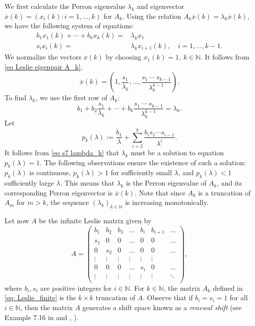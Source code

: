 \documentclass[11pt,reqno]{amsart}
\theoremstyle{definition}
\theoremstyle{remark}
\theoremstyle{plain}
\def\ol{\overline}
\newcommand{\N}{\mathbb N}
\newcommand{\be}{\begin{equation}}
\newcommand{\ee}{\end{equation}}
\newcommand{\ba}{\begin{aligned}}
\newcommand{\ea}{\end{aligned}}
\numberwithin{equation}{section}
\begin{document}
We first calculate the Perron eigenvalue $\lambda_k$ and eigenvector 
$\ol x(k) =(x_i(k) :i =1,..., k)$ for $A_k$. Using the relation
$A_k \ol x(k) = \lambda_k \ol x(k)$, we have the following system of equations:
\be\label{eq Leslie eigenpair A_k}
\ba 
b_1 x_1(k) + \cdots + b_k x_k(k) = & \lambda_k x_1\\
s_i x_i(k) = & \lambda_k x_{i+1}(k), \quad i = 1, ..., k-1.
\ea
\ee
We normalize the vectors $\ol x(k)$ by choosing $x_1(k) =1,\ k \in \N$. It follows from \eqref{eq Leslie eigenpair A_k},
\be\label{eq x(k) for Leslie A_k}
\ol x(k)  = \left(1, \frac{s_1}{\lambda_k}, \ldots, \frac{s_1\ \cdots \ s_{k-1}}{\lambda_k^{k-1}}\right).
\ee
To find $\lambda_k$, we use the first row of $A_k$:
\be\label{eq s7 lambda_k}
b_1 + b_2 \frac{s_1}{\lambda_k} + \cdots + b_k\frac{s_1\ \cdots\  s_{k-1}}{\lambda_k^{k-1}} = \lambda_k. 
\ee
Let 
$$
p_k(\lambda) := \dfrac{b_1}{\lambda} + \sum_{i=2}^k \frac{b_i s_1\cdots s_{i-1} }{\lambda^{i}}.
$$ 
It follows from \eqref{eq s7 lambda_k} that $\lambda_k$ must be a solution to equation $p_k(\lambda) =1$. The following observations ensure the existence of such a solution: 
$p_k(\lambda)$ is continuous, $p_k(\lambda)> 1$ for sufficiently small $\lambda$, and $p_k(\lambda) < 1$ sufficiently large $\lambda$. This means that $\lambda_k$ is the Perron eigenvalue of $A_k$, and its corresponding Perron eigenvector is $\ol x(k)$. Note that since $A_k$ is a truncation of $A_m$ for $m>k$, the sequence $(\lambda_k)_{k \in \N}$ is increasing monotonically. 

Let now $A$ be the infinite Leslie matrix given by
\begin{equation}\label{Mat: Les_inf}
    A = \begin{pmatrix}
b_1 & b_2 & b_3 &  \ldots & b_i & b_{i+1} &\ldots\\
s_1 & 0& 0 &   \ldots & 0 & 0 &\ldots \\
0 &  s_2 & 0 &   \ldots & 0 & 0 &\ldots \\
\vdots & \vdots & \vdots & \vdots & \vdots & \vdots & \\
0 & 0& 0& \ldots & s_i & 0 & \ldots \\
\vdots & \vdots & \vdots & \vdots & \vdots & \vdots & \ddots\\
\end{pmatrix},
\end{equation} 
where $b_i,s_i$ are positive integers for $i \in \N$. For $k \in \N$, the matrix $A_k$ defined in \eqref{eq: Leslie_finite} is the $k \times k$ truncation of $A$. Observe that if $b_i = s_i = 1$ for all $i \in \mathbb{N}$, then the matrix $A$ generates a shift space known as a \textit{renewal shift} (see Example 7.16 in \cite{BezuglyiJorgensenKarpelSanadhya2025} and \cite{Raszeja2021}, \cite{BEFR2022}).
\end{document}
